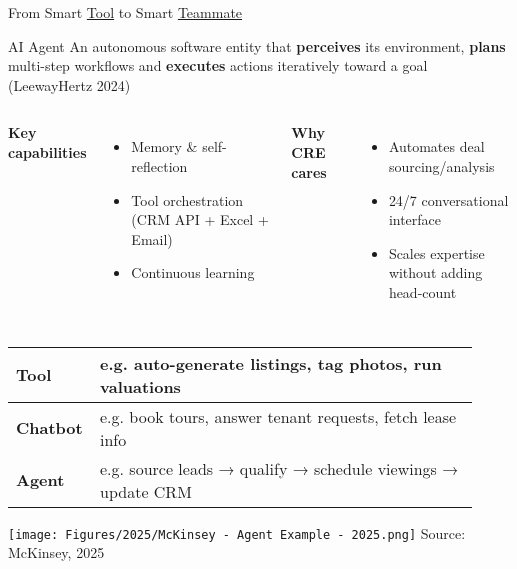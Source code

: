 \documentclass{beamer}
\begin{document}
\begin{frame}{From Smart \underline{Tool} to Smart \underline{Teammate}}
  \begin{block}{AI Agent}
    An autonomous software entity that \textbf{perceives} its environment,
    \textbf{plans} multi-step workflows and \textbf{executes} actions iteratively
    toward a goal (LeewayHertz 2024)
  \end{block}

  \begin{columns}[T]
      \textbf{Key capabilities}
      \begin{itemize}\scriptsize
        \item Memory \& self-reflection
        \item Tool orchestration (CRM API + Excel + Email)
        \item Continuous learning
      \end{itemize}
      \textbf{Why CRE cares}
      \begin{itemize}\scriptsize
        \item Automates deal sourcing/analysis
        \item 24/7 conversational interface
        \item Scales expertise without adding head-count
      \end{itemize}
  \end{columns}

  \vspace{0.9em}
  \centering
  \footnotesize
\begin{tabular}{|p{0.12\linewidth}|p{0.8\linewidth}|}
  \hline
  \textbf{Tool}    & e.g. auto-generate listings, tag photos, run valuations \\ \hline
  \textbf{Chatbot}& e.g. book tours, answer tenant requests, fetch lease info \\ \hline
  \rowcolor{blue!10}
  \textbf{Agent}  & e.g. source leads → qualify → schedule viewings → update CRM \\ \hline
\end{tabular}

\end{frame}

\begin{frame}[plain]
    \vfill %
    \centering %
    \texttt{[image: Figures/2025/McKinsey - Agent Example - 2025.png]}
    \vspace{1cm}
    \tiny Source: McKinsey, 2025
    \vfill %
\end{frame}
\end{document}
